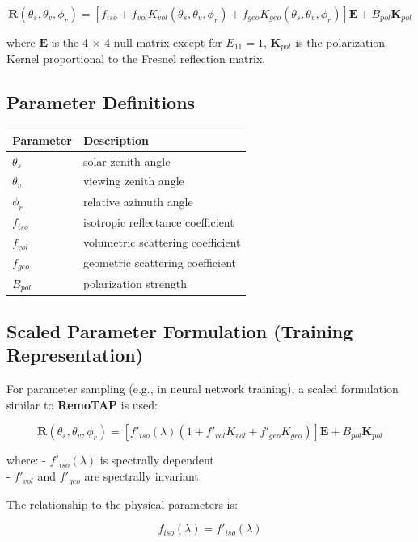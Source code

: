 \documentclass[
  letterpaper,
]{scrbook}
\begin{document}
\[
\mathbf{R}(\theta_s,\theta_v,\phi_r) =
\left[
f_{iso}
+
f_{vol} K_{vol}(\theta_s,\theta_v,\phi_r)
+
f_{geo} K_{geo}(\theta_s,\theta_v,\phi_r)
\right]\mathbf{E}
+
B_{pol}\mathbf{K}_{pol}
\]

where \(\mathbf{E}\) is the 4 \(\times\) 4 null matrix except for
\(E_{11}=1\), \(\mathbf{K}_{pol}\) is the polarization Kernel
proportional to the Fresnel reflection matrix.

\subsection{Parameter Definitions}\label{parameter-definitions}

\begin{longtable}[]{@{}ll@{}}
\toprule\noalign{}
Parameter & Description \\
\midrule\noalign{}
\endhead
\bottomrule\noalign{}
\endlastfoot
\(\theta_s\) & solar zenith angle \\
\(\theta_v\) & viewing zenith angle \\
\(\phi_r\) & relative azimuth angle \\
\(f_{iso}\) & isotropic reflectance coefficient \\
\(f_{vol}\) & volumetric scattering coefficient \\
\(f_{geo}\) & geometric scattering coefficient \\
\(B_{pol}\) & polarization strength \\
\end{longtable}

\subsection{Scaled Parameter Formulation (Training
Representation)}\label{scaled-parameter-formulation-training-representation}

For parameter sampling (e.g., in neural network training), a scaled
formulation similar to \textbf{RemoTAP} is used:

\[
\mathbf{R}(\theta_s,\theta_v,\phi_r) =
\left[
f'_{iso}(\lambda)
\left(
1
+
f'_{vol} K_{vol}
+
f'_{geo} K_{geo}
\right)
\right]\mathbf{E}
+
B_{pol}\mathbf{K}_{pol}
\]

where: - \(f'_{iso}(\lambda)\) is spectrally dependent\\
- \(f'_{vol}\) and \(f'_{geo}\) are spectrally invariant

The relationship to the physical parameters is:

\[
f_{iso}(\lambda) = f'_{iso}(\lambda)
\]
\end{document}
